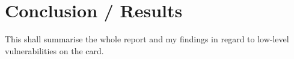 \documentclass[bsc,frontabs,twoside,singlespacing,parskip,deptreport]{infthesis}     %
\begin{document}
\chapter{Conclusion / Results}

This shall summarise the whole report and my findings in regard to low-level vulnerabilities on the card.





\end{document}
